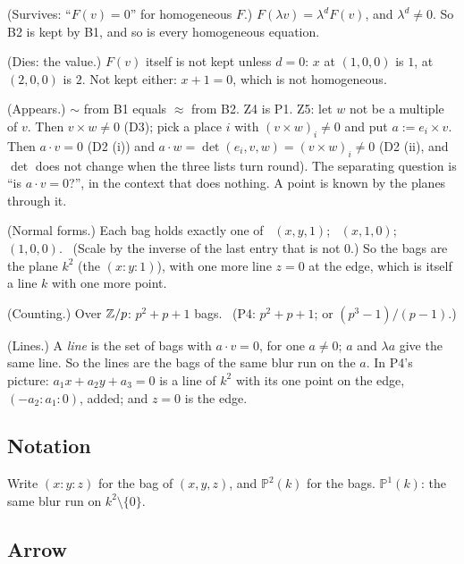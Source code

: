 \begin{lines}
\item[\lab{P1}] (Survives: ``$F(v) = 0$'' for homogeneous $F$.) $F(\lambda v) = \lambda^d F(v)$, and $\lambda^d \ne 0$. So B2 is kept by B1, and so is every homogeneous equation.
\item[\lab{P2}] (Dies: the value.) $F(v)$ itself is not kept unless $d = 0$: $x$ at $(1, 0, 0)$ is $1$, at $(2, 0, 0)$ is $2$. Not kept either: $x + 1 = 0$, which is not homogeneous.
\item[\lab{P3}] (Appears.) $\sim$ from B1 equals $\approx$ from B2. Z4 is P1. Z5: let $w$ not be a multiple of $v$. Then $v \times w \ne 0$ (D3); pick a place $i$ with $(v \times w)_i \ne 0$ and put $a := e_i \times v$. Then $a \cdot v = 0$ (D2 (i)) and $a \cdot w = \det(e_i, v, w) = (v \times w)_i \ne 0$ (D2 (ii), and $\det$ does not change when the three lists turn round). The separating question is ``is $a \cdot v = 0$?'', in the context that does nothing. A point is known by the planes through it.
\item[\lab{P4}] (Normal forms.) Each bag holds exactly one of \ $(x, y, 1)$; \ $(x, 1, 0)$; \ $(1, 0, 0)$. \ (Scale by the inverse of the last entry that is not $0$.) So the bags are the plane $k^2$ (the $(x : y : 1)$), with one more line $z = 0$ at the edge, which is itself a line $k$ with one more point.
\item[\lab{P5}] (Counting.) Over $\mathbb{Z}/p$: $p^2 + p + 1$ bags. \ (P4: $p^2 + p + 1$; or $(p^3 - 1)/(p - 1)$.)
\item[\lab{P6}] (Lines.) A \emph{line} is the set of bags with $a \cdot v = 0$, for one $a \ne 0$; $a$ and $\lambda a$ give the same line. So the lines are the bags of the same blur run on the $a$. In P4's picture: $a_1 x + a_2 y + a_3 = 0$ is a line of $k^2$ with its one point on the edge, $(-a_2 : a_1 : 0)$, added; and $z = 0$ is the edge.
\end{lines}

\subsection*{Notation}

\begin{lines}
\item[\lab{N1}] Write $(x : y : z)$ for the bag of $(x, y, z)$, and $\mathbb{P}^2(k)$ for the bags. $\mathbb{P}^1(k)$: the same blur run on $k^2 \setminus \{0\}$.
\end{lines}

\subsection*{Arrow}

